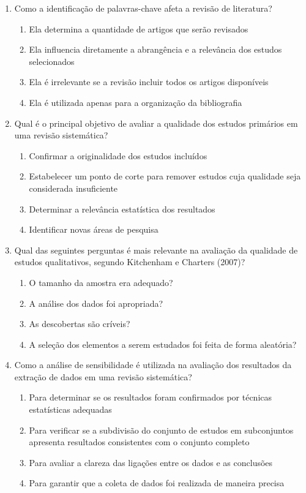 \documentclass{article}
\begin{document}
\begin{enumerate}
\item Como a identificação de palavras-chave afeta a revisão de literatura?
\begin{enumerate}
    \item  Ela determina a quantidade de artigos que serão revisados
    \item  Ela influencia diretamente a abrangência e a relevância dos estudos selecionados
    \item  Ela é irrelevante se a revisão incluir todos os artigos disponíveis
    \item  Ela é utilizada apenas para a organização da bibliografia
\end{enumerate}

\item Qual é o principal objetivo de avaliar a qualidade dos estudos primários em uma revisão sistemática?
\begin{enumerate}
\item Confirmar a originalidade dos estudos incluídos
\item Estabelecer um ponto de corte para remover estudos cuja qualidade seja considerada insuficiente
\item Determinar a relevância estatística dos resultados
\item Identificar novas áreas de pesquisa
\end{enumerate}

\item  Qual das seguintes perguntas é mais relevante na avaliação da qualidade de estudos qualitativos, segundo Kitchenham e Charters (2007)?
\begin{enumerate}
\item O tamanho da amostra era adequado?
\item A análise dos dados foi apropriada?
\item As descobertas são críveis?
\item A seleção dos elementos a serem estudados foi feita de forma aleatória?
\end{enumerate}

\item Como a análise de sensibilidade é utilizada na avaliação dos resultados da extração de dados em uma revisão sistemática?
\begin{enumerate}
\item Para determinar se os resultados foram confirmados por técnicas estatísticas adequadas
\item Para verificar se a subdivisão do conjunto de estudos em subconjuntos apresenta resultados consistentes com o conjunto completo
\item Para avaliar a clareza das ligações entre os dados e as conclusões
\item Para garantir que a coleta de dados foi realizada de maneira precisa
\end{enumerate}

\end{enumerate}
\end{document}
